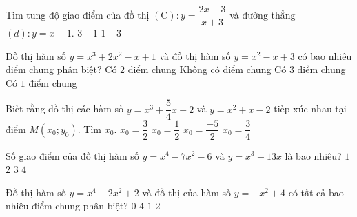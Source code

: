 \begin{ex}%
Tìm tung độ giao điểm của đồ thị $(\mathrm{C})\colon y=\dfrac{2x-3}{x+3}$ và đường thẳng $(d)\colon y=x-1$.
\choice
{$3$}
{\True $-1$}
{$1$}
{$-3$}
\end{ex}
\begin{ex}%
Đồ thị hàm số $y=x^3+2x^2-x+1$ và đồ thị hàm số $y=x^2-x+3$ có bao nhiêu điểm chung phân biệt?
\choice
{Có $2$ điểm chung}
{Không có điểm chung}
{Có $3$ điểm chung}
{\True Có $1$ điểm chung}
\end{ex}
\begin{ex}%
Biết rằng đồ thị các hàm số $y=x^3+\dfrac{5}{4}x-2$ và $y=x^2+x-2$ tiếp xúc nhau tại điểm $M(x_0;y_0)$. Tìm $x_0$.
\choice
{$x_0=\dfrac{3}{2}$}
{\True $x_0=\dfrac{1}{2}$}
{$x_0=\dfrac{-5}{2}$}
{$x_0=\dfrac{3}{4}$}
\end{ex}
\begin{ex}%
Số giao điểm của đồ thị hàm số $y=x^4-7x^2-6$ và $y=x^3-13x$ là bao nhiêu?
\choice
{$1$}
{$2$}
{\True $3$}
{$4$}
\end{ex}
\begin{ex}%
Đồ thị hàm số $y=x^4-2x^2+2$ và đồ thị của hàm số $y=-x^2+4$ có tất cả bao nhiêu điểm chung phân biệt?
\choice
{$0$}
{$4$}
{$1$}
{\True $2$}
\end{ex}
